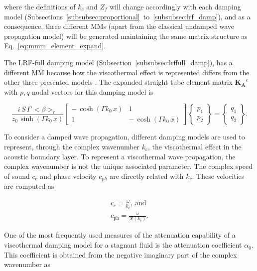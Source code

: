 \documentclass[12pt]{article}
\begin{document}
\noindent where the definitions of $k_c$ and $Z_f$ will change accordingly with each damping model (Subsections~\ref{subsubsec:proportional}~to~\ref{subsubsec:lrf_damp}), and as a consequence, three different \acrshort{MMs} (apart from the classical undamped wave propagation model) will be generated maintaining the same matrix structure as Eq.~\ref{eq:mmm_element_expand}.

The \acrshort{LRF}-full damping model (Subsection~\ref{subsubsec:lrffull_damp}), has a different \acrshort{MM} because how the viscothermal effect is represented differs from the other three presented models \cite[see][]{TIJDEMAN19751}. The expanded straight tube element matrix $\mathbf{K_{\text{A}}}^e$ with $p, q$ nodal vectors for this damping model is

\begin{equation} \label{eq:mm_system_complete_damped_lrf_full} 
	\frac{i \, S \, \Gamma \, <\beta>_r}{z_0 \, \sinh(\Gamma k_0 \, x)}
	\begin{bmatrix}
		-  \,  \cosh(\Gamma k_0 \, x)  & 1 \\
		1 & - \, \cosh(\Gamma k_0 \, x)
	\end{bmatrix}
	\begin{Bmatrix}
		p_1 \\
		p_2
	\end{Bmatrix}
	=
	\begin{Bmatrix}
		q_1 \\
		q_2 
	\end{Bmatrix}.
\end{equation}

To consider a damped wave propagation, different damping models are used to represent, through the complex wavenumber $k_c$, the viscothermal effect in the acoustic boundary layer. To represent a viscothermal wave propagation, the complex wavenumber is not the unique associated parameter. The complex speed of sound $c_c$ and phase velocity $c_{ph}$ are directly related with $k_c$. These velocities are computed as

\begin{gather} \label{eq:c_c}
	c_c = \frac{\omega}{k_c}, \, \text{and}  \\ \label{eq:c_phase}
	c_{\text{ph}} = \frac{\omega}{\mathcal{R}(k_c)}. %
\end{gather}

One of the most frequently used measures of the attenuation capability of a viscothermal damping model for a stagnant fluid is the attenuation coefficient $\alpha_0$. This coefficient is obtained from the negative imaginary part of the complex wavenumber as
\end{document}
